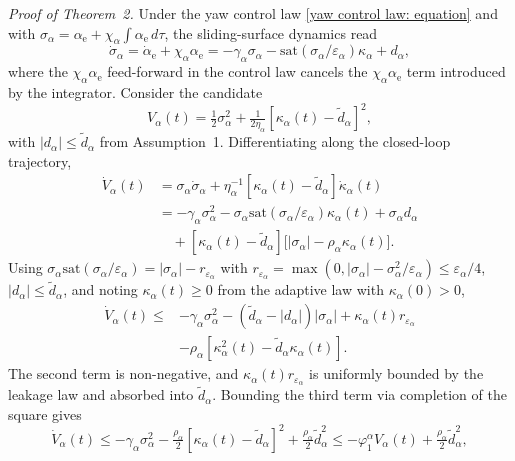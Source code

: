 \documentclass{IEEEtaes}
\begin{document}
\textit{Proof of Theorem~2.} Under the yaw control law \eqref{yaw control law: equation} and with $\sigma_\alpha=\alpha_\text{e}+\chi_\alpha\!\int\alpha_\text{e}\,d\tau$, the sliding-surface dynamics read
\begin{equation} \label{yaw sigma dynamics: equation}
\dot{\sigma}_\alpha = \dot{\alpha}_\text{e} + \chi_\alpha\alpha_\text{e} = -\gamma_\alpha\sigma_\alpha - \text{sat}(\sigma_\alpha/\varepsilon_\alpha)\kappa_\alpha + d_\alpha,
\end{equation}
where the $\chi_\alpha\alpha_\text{e}$ feed-forward in the control law cancels the $\chi_\alpha\alpha_\text{e}$ term introduced by the integrator. Consider the candidate
\begin{equation} \label{V alpha candidate: equation}
    V_\alpha(t) = \tfrac12\sigma_\alpha^2 + \tfrac{1}{2\eta_\alpha}[\kappa_\alpha(t)-\tilde{d}_\alpha]^2,
\end{equation}
with $|d_\alpha|\le\tilde{d}_\alpha$ from Assumption~1. Differentiating along the closed-loop trajectory,
\begin{align*}
\dot{V}_\alpha(t) &= \sigma_\alpha\dot{\sigma}_\alpha + \eta_\alpha^{-1}[\kappa_\alpha(t)-\tilde{d}_\alpha]\dot{\kappa}_\alpha(t)\\
&= -\gamma_\alpha\sigma_\alpha^2 - \sigma_\alpha\text{sat}(\sigma_\alpha/\varepsilon_\alpha)\kappa_\alpha(t) + \sigma_\alpha d_\alpha\\
&\quad + [\kappa_\alpha(t)-\tilde{d}_\alpha]\big[|\sigma_\alpha| - \rho_\alpha\kappa_\alpha(t)\big].
\end{align*}
Using $\sigma_\alpha\text{sat}(\sigma_\alpha/\varepsilon_\alpha) = |\sigma_\alpha| - r_{\varepsilon_\alpha}$ with $r_{\varepsilon_\alpha}=\max(0,|\sigma_\alpha|-\sigma_\alpha^2/\varepsilon_\alpha)\le\varepsilon_\alpha/4$, $|d_\alpha|\le\tilde{d}_\alpha$, and noting $\kappa_\alpha(t)\ge 0$ from the adaptive law with $\kappa_\alpha(0)>0$,
\begin{align*}
\dot{V}_\alpha(t) \le& -\gamma_\alpha\sigma_\alpha^2 - (\tilde{d}_\alpha-|d_\alpha|)|\sigma_\alpha| + \kappa_\alpha(t) r_{\varepsilon_\alpha}\\
&- \rho_\alpha[\kappa_\alpha^2(t) - \tilde{d}_\alpha\kappa_\alpha(t)].
\end{align*}
The second term is non-negative, and $\kappa_\alpha(t) r_{\varepsilon_\alpha}$ is uniformly bounded by the leakage law and absorbed into $\tilde{d}_\alpha$. Bounding the third term via completion of the square gives
\begin{equation} \label{V alpha dot bound: equation}
\dot{V}_\alpha(t) \le -\gamma_\alpha\sigma_\alpha^2 - \tfrac{\rho_\alpha}{2}[\kappa_\alpha(t)-\tilde{d}_\alpha]^2 + \tfrac{\rho_\alpha}{2}\tilde{d}_\alpha^2 \le -\varphi_1^\alpha V_\alpha(t) + \tfrac{\rho_\alpha}{2}\tilde{d}_\alpha^2,
\end{equation}
\end{document}
